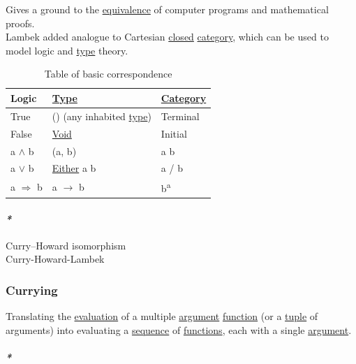 \documentclass[11pt]{article}
\begin{document}
Gives a ground to the \hyperref[orgad1fc87]{equivalence} of computer programs and mathematical proofs.\\

Lambek added analogue to Cartesian \hyperref[orgfa67abb]{closed} \hyperref[org3e3a79b]{category}, which can be used to model logic and \hyperref[org4fbaeb8]{type} theory.\\

\begin{table}[htbp]
\caption{\label{tab:table-of-basic-correspondence}Table of basic correspondence}
\centering
\begin{tabular}{lll}
Logic & \hyperref[org4fbaeb8]{Type} & \hyperref[org3e3a79b]{Category}\\
\hline
True & () (any inhabited \hyperref[org4fbaeb8]{type}) & Terminal\\
False & \hyperref[org94d6fd1]{Void} & Initial\\
a \(\land\) b & (a, b) & a \texttimes{} b\\
a \(\lor\) b & \hyperref[orgbc5fdf7]{Either} a b & a /     b\\
a \(\Rightarrow\) b & a \(\to\) b & b\textsuperscript{a}\\
\end{tabular}
\end{table}

\paragraph{\emph{*}}
\label{sec:orgd5bd22f}

\label{org2eaaadc}Curry–Howard isomorphism\\
\label{org6c9b16b}Curry-Howard-Lambek\\

\subsubsection{\label{orgf128f96}Currying}
\label{sec:org041c427}
Translating the \hyperref[org5445907]{evaluation} of a multiple \hyperref[orgf66a5f7]{argument} \hyperref[orgeb5cddb]{function} (or a \hyperref[org7c37a79]{tuple} of arguments) into evaluating a \hyperref[orgf90a45c]{sequence} of \hyperref[org66c5288]{functions}, each with a single \hyperref[orgf66a5f7]{argument}.\\

\paragraph{\emph{*}}
\label{sec:orgae8f113}
\end{document}
